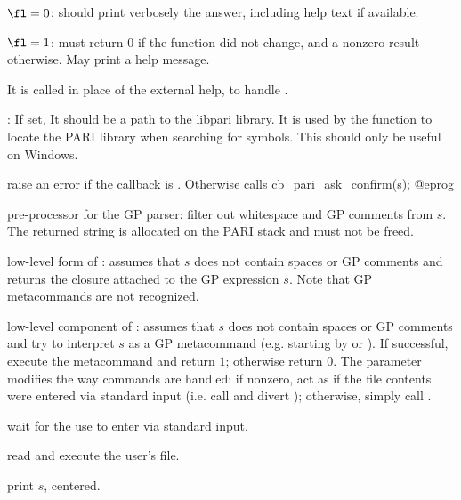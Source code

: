 \item $\fl = 0$: should print verbosely the answer, including help text if
available.

\item $\fl = 1$: must return $0$ if the function did not change, and a
nonzero result otherwise. May print a help message.

It is called in place of the external help, to handle .


: If set, It should be a path to the libpari library.
It is used by the function  to locate the PARI library when
searching for symbols.  This should only be useful on Windows.


 raise an error if the
callback  is . Otherwise
calls
\bprog
  cb_pari_ask_confirm(s);
@eprog

 pre-processor for the GP
parser: filter out whitespace and GP comments from $s$. The returned string
is allocated on the PARI stack and must not be freed.

 low-level form of
: assumes that $s$ does not contain spaces or GP comments and
returns the closure attached to the GP expression $s$. Note
that GP metacommands are not recognized.

 low-level component of
: assumes that $s$ does not contain spaces or GP comments and
try to interpret $s$ as a GP metacommand (e.g. starting by \kbd{\bs} or
). If successful, execute the metacommand and return $1$; otherwise
return $0$. The  parameter modifies the way  commands
are handled: if nonzero, act as if the file contents were entered via
standard input (i.e. call  and divert );
otherwise, simply call .

 wait for the use to enter 
via standard input.

 read and execute the user's  file.

 print $s$, centered.

